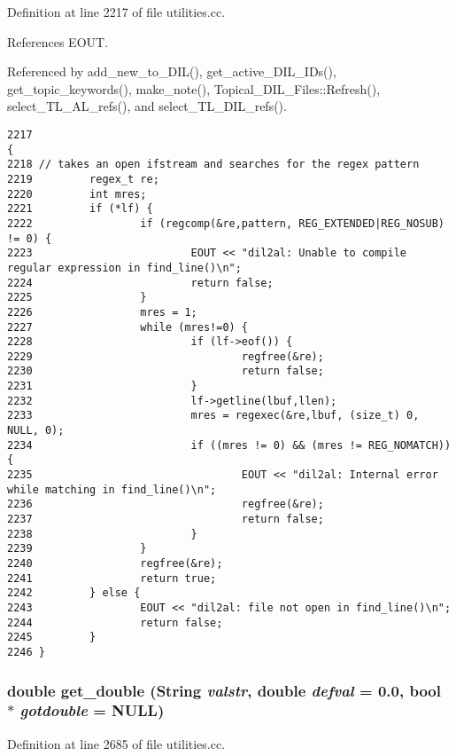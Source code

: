 Definition at line 2217 of file utilities.cc.

References EOUT.

Referenced by add\_\-new\_\-to\_\-DIL(), get\_\-active\_\-DIL\_\-IDs(), get\_\-topic\_\-keywords(), make\_\-note(), Topical\_\-DIL\_\-Files::Refresh(), select\_\-TL\_\-AL\_\-refs(), and select\_\-TL\_\-DIL\_\-refs().



\footnotesize\begin{verbatim}2217                                                                            {
2218 // takes an open ifstream and searches for the regex pattern
2219         regex_t re;
2220         int mres;
2221         if (*lf) {
2222                 if (regcomp(&re,pattern, REG_EXTENDED|REG_NOSUB) != 0) {
2223                         EOUT << "dil2al: Unable to compile regular expression in find_line()\n";
2224                         return false;
2225                 }
2226                 mres = 1;
2227                 while (mres!=0) {
2228                         if (lf->eof()) {
2229                                 regfree(&re);
2230                                 return false;
2231                         }
2232                         lf->getline(lbuf,llen);
2233                         mres = regexec(&re,lbuf, (size_t) 0, NULL, 0);
2234                         if ((mres != 0) && (mres != REG_NOMATCH)) {
2235                                 EOUT << "dil2al: Internal error while matching in find_line()\n";
2236                                 regfree(&re);
2237                                 return false;
2238                         }
2239                 }
2240                 regfree(&re);
2241                 return true;
2242         } else {
2243                 EOUT << "dil2al: file not open in find_line()\n";
2244                 return false;
2245         }
2246 }
\end{verbatim}\normalsize 
{}
\subsubsection{\setlength{\rightskip}{0pt plus 5cm}double get\_\-double ({\bf String} {\em valstr}, double {\em defval} = 0.0, bool $\ast$ {\em gotdouble} = NULL)}\label{utilities_8cc_a82}




Definition at line 2685 of file utilities.cc.

